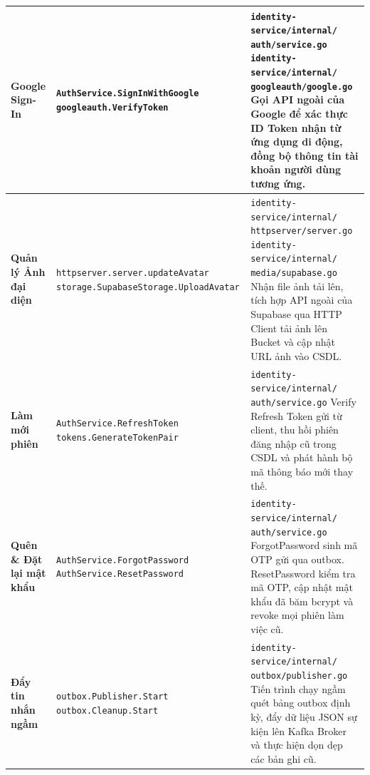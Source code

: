 \documentclass[14pt,a4paper,oneside]{extreport}
\begin{document}
\begin{table}[H]
\begin{tabularx}{\textwidth}{|>{\raggedright\arraybackslash}p{2.5cm}|>{\hsize=0.8\hsize\raggedright\arraybackslash}X|>{\hsize=1.2\hsize\raggedright\arraybackslash}X|}
\hline
\textbf{Google Sign-In} &
  \texttt{AuthService.\allowbreak SignInWithGoogle} \newline
  \texttt{googleauth.\allowbreak VerifyToken} &
  \texttt{identity-service/internal/} \newline \texttt{auth/service.go} \newline
  \texttt{identity-service/internal/} \newline \texttt{googleauth/google.go} \newline
  Gọi API ngoài của Google để xác thực ID Token nhận từ ứng dụng di động, đồng bộ thông tin tài khoản người dùng tương ứng. \\
\hline
\textbf{Quản lý Ảnh đại diện} &
  \texttt{httpserver.\allowbreak server.\allowbreak updateAvatar} \newline
  \texttt{storage.\allowbreak SupabaseStorage.\allowbreak UploadAvatar} &
  \texttt{identity-service/internal/} \newline \texttt{httpserver/server.go} \newline
  \texttt{identity-service/internal/} \newline \texttt{media/supabase.go} \newline
  Nhận file ảnh tải lên, tích hợp API ngoài của Supabase qua HTTP Client tải ảnh lên Bucket và cập nhật URL ảnh vào CSDL. \\
\hline
\textbf{Làm mới phiên} &
  \texttt{AuthService.\allowbreak RefreshToken} \newline
  \texttt{tokens.\allowbreak GenerateTokenPair} &
  \texttt{identity-service/internal/} \newline \texttt{auth/service.go} \newline
  Verify Refresh Token gửi từ client, thu hồi phiên đăng nhập cũ trong CSDL và phát hành bộ mã thông báo mới thay thế. \\
\hline
\textbf{Quên \& Đặt lại mật khẩu} &
  \texttt{AuthService.\allowbreak ForgotPassword} \newline
  \texttt{AuthService.\allowbreak ResetPassword} &
  \texttt{identity-service/internal/} \newline \texttt{auth/service.go} \newline
  ForgotPassword sinh mã OTP gửi qua outbox. ResetPassword kiểm tra mã OTP, cập nhật mật khẩu đã băm bcrypt và revoke mọi phiên làm việc cũ. \\
\hline
\textbf{Đẩy tin nhắn ngầm} &
  \texttt{outbox.\allowbreak Publisher.\allowbreak Start} \newline
  \texttt{outbox.\allowbreak Cleanup.\allowbreak Start} &
  \texttt{identity-service/internal/} \newline \texttt{outbox/publisher.go} \newline
  Tiến trình chạy ngầm quét bảng outbox định kỳ, đẩy dữ liệu JSON sự kiện lên Kafka Broker và thực hiện dọn dẹp các bản ghi cũ. \\
\hline
\end{tabularx}
\end{table}
\end{document}
